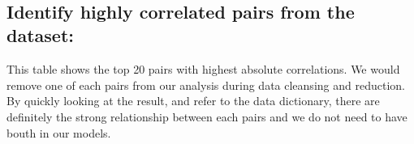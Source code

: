 \documentclass[11pt]{article}
\begin{document}
    \begin{center}
    \end{center}
    { \hspace*{\fill} \\}
    
    \subsection{Identify highly correlated pairs from the
dataset:}\label{identify-highly-correlated-pairs-from-the-dataset}

This table shows the top 20 pairs with highest absolute correlations. We
would remove one of each pairs from our analysis during data cleansing
and reduction. By quickly looking at the result, and refer to the data
dictionary, there are definitely the strong relationship between each
pairs and we do not need to have bouth in our models.
\end{document}
